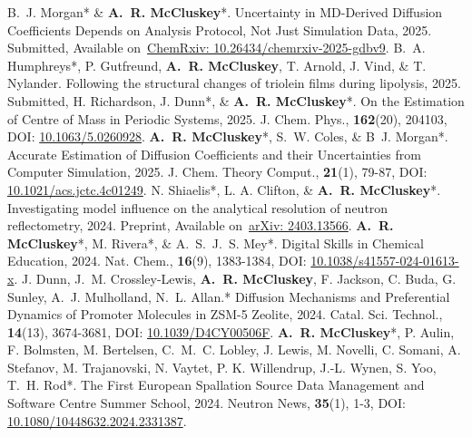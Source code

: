 \begin{benumerate}{25}
   \cvpuby
    {B.~J. Morgan* \& \textbf{A.~R. McCluskey}*.}
    {Uncertainty in MD-Derived Diffusion Coefficients Depends on Analysis Protocol, Not Just Simulation Data,}
    {2025.}
    {Submitted,}
    {}
    {Available on~\href{https://doi.org/10.26434/chemrxiv-2025-gdbv9}{ChemRxiv: 10.26434/chemrxiv-2025-gdbv9}.}
   \cvpuby
    {B.~A. Humphreys*, P. Gutfreund, \textbf{A.~R. McCluskey}, T. Arnold, J. Vind, \& T. Nylander.}
    {Following the structural changes of triolein films during lipolysis,}
    {2025.}
    {Submitted,}
    {}
    {}
   \cvpuby
    {H. Richardson, J. Dunn*, \& \textbf{A.~R. McCluskey}*.}
    {On the Estimation of Centre of Mass in Periodic Systems,}
    {2025.}
    {J. Chem. Phys.,}
    {\textbf{162}(20), 204103,}
    {DOI: \href{https://doi.org/10.1063/5.0260928}{10.1063/5.0260928}.}
   \cvpuby
    {\textbf{A.~R. McCluskey}*, S.~W. Coles, \& B~J. Morgan*.}
    {Accurate Estimation of Diffusion Coefficients and their Uncertainties from Computer Simulation,}
    {2025.}
    {J. Chem. Theory Comput.,}
    {\textbf{21}(1), 79-87,}
    {DOI: \href{https://doi.org/10.1021/acs.jctc.4c01249}{10.1021/acs.jctc.4c01249}.}
  \cvpuby
    {N. Shiaelis*, L. A. Clifton, \& \textbf{A.~R. McCluskey}*.}
    {Investigating model influence on the analytical resolution of neutron reflectometry,}
    {2024.}
    {Preprint,}
    {}
    {Available on~\href{https://arxiv.org/abs/2403.13566}{arXiv: 2403.13566}.}
  \cvpuby
    {\textbf{A.~R. McCluskey}*, M. Rivera*, \& A.~S.~J.~S. Mey*.}
    {Digital Skills in Chemical Education,}
    {2024.}
    {Nat. Chem.,}
    {\textbf{16}(9), 1383-1384,}
    {DOI: \href{https://doi.org/10.1038/s41557-024-01613-x}{10.1038/s41557-024-01613-x}.}
  \cvpuby
    {J. Dunn, J.~M. Crossley-Lewis, \textbf{A.~R. McCluskey}, F. Jackson, C. Buda, G. Sunley, A.~J. Mulholland, N.~L. Allan.*}
    {Diffusion Mechanisms and Preferential Dynamics of Promoter Molecules in ZSM-5 Zeolite,}
    {2024.}
    {Catal. Sci. Technol.,}
    {\textbf{14}(13), 3674-3681,}
    {DOI: \href{https://doi.org/10.1039/D4CY00506F}{10.1039/D4CY00506F}.}
  \cvpuby
    {\textbf{A.~R. McCluskey}*, P. Aulin, F. Bolmsten, M. Bertelsen, C.~M.~C. Lobley, J. Lewis, M. Novelli, C. Somani, A. Stefanov, M. Trajanovski, N. Vaytet, P. K. Willendrup, J.-L. Wynen, S. Yoo, T.~H. Rod*.}
    {The First European Spallation Source Data Management and Software Centre Summer School,}
    {2024.}
    {Neutron News,}
    {\textbf{35}(1), 1-3,}
    {DOI: \href{https://doi.org/10.1080/10448632.2024.2331387}{10.1080/10448632.2024.2331387}.}

\end{benumerate}
